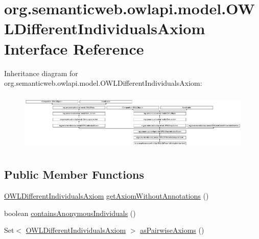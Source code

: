 \hypertarget{interfaceorg_1_1semanticweb_1_1owlapi_1_1model_1_1_o_w_l_different_individuals_axiom}{\section{org.\-semanticweb.\-owlapi.\-model.\-O\-W\-L\-Different\-Individuals\-Axiom Interface Reference}
\label{interfaceorg_1_1semanticweb_1_1owlapi_1_1model_1_1_o_w_l_different_individuals_axiom}
}
Inheritance diagram for org.\-semanticweb.\-owlapi.\-model.\-O\-W\-L\-Different\-Individuals\-Axiom\-:\begin{figure}[H]
\begin{center}
\leavevmode
\includegraphics[height=2.821159cm]{interfaceorg_1_1semanticweb_1_1owlapi_1_1model_1_1_o_w_l_different_individuals_axiom}
\end{center}
\end{figure}
\subsection*{Public Member Functions}
\begin{DoxyCompactItemize}
\item 
\hyperlink{interfaceorg_1_1semanticweb_1_1owlapi_1_1model_1_1_o_w_l_different_individuals_axiom}{O\-W\-L\-Different\-Individuals\-Axiom} \hyperlink{interfaceorg_1_1semanticweb_1_1owlapi_1_1model_1_1_o_w_l_different_individuals_axiom_a71afa2ca898b9a1fa630fda3633158b9}{get\-Axiom\-Without\-Annotations} ()
\item 
boolean \hyperlink{interfaceorg_1_1semanticweb_1_1owlapi_1_1model_1_1_o_w_l_different_individuals_axiom_a321ec6164bd725c493f4d5fb72a7661d}{contains\-Anonymous\-Individuals} ()
\item 
Set$<$ \hyperlink{interfaceorg_1_1semanticweb_1_1owlapi_1_1model_1_1_o_w_l_different_individuals_axiom}{O\-W\-L\-Different\-Individuals\-Axiom} $>$ \hyperlink{interfaceorg_1_1semanticweb_1_1owlapi_1_1model_1_1_o_w_l_different_individuals_axiom_a3da6243cdd409b833369dc4ee0b5ec4c}{as\-Pairwise\-Axioms} ()
\end{DoxyCompactItemize}


